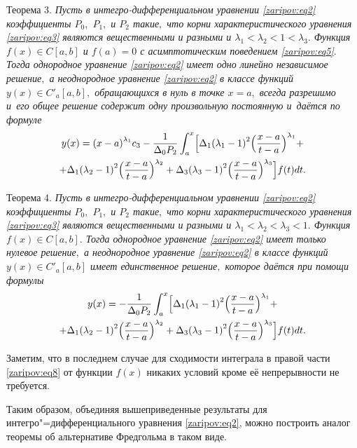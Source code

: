 {\small \sc Теорема 3.} {\it Пусть в интегро-дифференциальном уравнении \eqref{zaripov:eq2} коэффициенты $P_0,$ $P_1,$  и $P_2$  такие$,$ что корни характеристического уравнения \eqref{zaripov:eq3} являются вещественными и разными и $\lambda_1< \lambda_2<1< \lambda_3.$ 
Функция $f(x)\in C[a,b]$   и  $f(a)=0$ с асимптотическим поведением \eqref{zaripov:eq5}$.$ 
Тогда однородное уравнение \eqref{zaripov:eq2} имеет одно линейно независимое решение$,$ а неоднородное уравнение \eqref{zaripov:eq2} в классе функций $y(x)\in C'_a[a,b],$  обращающихся в нуль в точке $x=a,$  всегда разрешимо и~его общее решение содержит одну произвольную постоянную и~даётся по формуле}
\begin{multline}
y(x)={(x-a)}^{{\lambda}_{1}}c_3
-\frac{1}{{\Delta_0}P_2}\int _{a}^{x}
\Bigl[{\Delta_1}
{\left({{\lambda_1}-1}\right)^2}\Bigl(\frac{x-a}{t-a}\Bigr)^{\lambda_1}+\\
+{\Delta_1}
{\left({{\lambda_2}-1}\right)^2}\Bigl(\frac{x-a}{t-a}\Bigr)^{\lambda_2}+
{\Delta_3}{\left({{\lambda_3}-1}\right)^2}\Bigl(\frac{x-a}{t-a}\Bigr)^{\lambda_3}\Bigr]f(t)dt.\label{zaripov:eq7}
\end{multline}

\smallskip

{\small\sc Теорема 4.} {\it Пусть в интегро-дифференциальном уравнении \eqref{zaripov:eq2} коэффициенты $P_0,$ $P_1,$  и $P_2$  такие$,$ что корни характеристического уравнения \eqref{zaripov:eq3} являются вещественными и разными и $\lambda_1< \lambda_2< \lambda_3<1.$ Функция $f(x)\in C[a,b].$ 
Тогда однородное уравнение \eqref{zaripov:eq2} имеет только нулевое решение$,$ а неоднородное уравнение \eqref{zaripov:eq2} в классе функций $y(x)\in C'_a[a,b]$ имеет единственное решение$,$ которое даётся при помощи формулы}
\begin{multline}
y(x)=-\frac{1}{{\Delta_0}P_2}\int _{a}^{x}\Bigl[{\Delta_1}
{\left({{\lambda_1}-1}\right)^2}
\Bigl(\frac{x-a}{t-a}\Bigr)^{\lambda_1}+\\
+{\Delta_1}
{\left({{\lambda_2}-1}\right)^2}
\Bigl(\frac{x-a}{t-a}\Bigr)^{\lambda_2}+
{\Delta_3}{\left({{\lambda_3}-1}\right)^2}\Bigl(\frac{x-a}{t-a}\Bigr)^{\lambda_3}\Bigr]f(t)dt.\label{zaripov:eq8}
\end{multline}

\smallskip

Заметим, что в последнем случае для сходимости интеграла в правой части \eqref{zaripov:eq8} от функции $f(x)$ никаких условий кроме её непрерывности не требуется.

Таким образом, объединяя вышеприведенные результаты для интегро"=дифференциального уравнения \eqref{zaripov:eq2}, можно построить аналог теоремы об альтернативе Фредгольма в таком виде.

